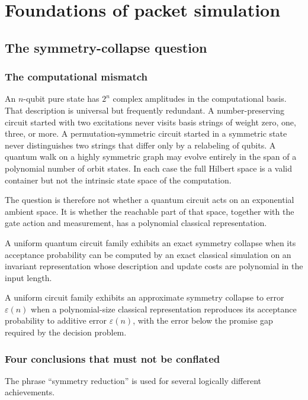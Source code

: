 \chapter{Foundations of packet simulation}
\section{The symmetry-collapse question}
\label{s:ch:question}

\subsection{The computational mismatch}
An $n$-qubit pure state has $2^n$ complex amplitudes in the computational basis. That description is universal but frequently redundant. A number-preserving circuit started with two excitations never visits basis strings of weight zero, one, three, or more. A permutation-symmetric circuit started in a symmetric state never distinguishes two strings that differ only by a relabeling of qubits. A quantum walk on a highly symmetric graph may evolve entirely in the span of a polynomial number of orbit states. In each case the full Hilbert space is a valid container but not the intrinsic state space of the computation.

The question is therefore not whether a quantum circuit acts on an exponential ambient space. It is whether the reachable part of that space, together with the gate action and measurement, has a polynomial classical representation.

\begin{definition}
A uniform quantum circuit family exhibits an exact symmetry collapse when its acceptance probability can be computed by an exact classical simulation on an invariant representation whose description and update costs are polynomial in the input length.
\end{definition}

\begin{definition}
A uniform circuit family exhibits an approximate symmetry collapse to error $\varepsilon(n)$ when a polynomial-size classical representation reproduces its acceptance probability to additive error $\varepsilon(n)$, with the error below the promise gap required by the decision problem.
\end{definition}

\subsection{Four conclusions that must not be conflated}
The phrase ``symmetry reduction'' is used for several logically different achievements.

